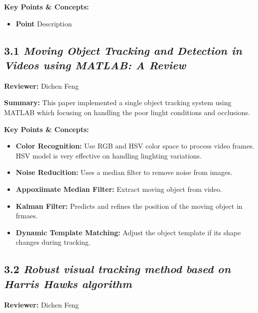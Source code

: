 \documentclass{article}
\begin{document}
\vspace{0.3cm}

\textbf{Key Points \& Concepts:}
\begin{itemize}
  \item \textbf{Point} Description
\end{itemize}

\subsection*{3.1 \textit{Moving Object Tracking and Detection in Videos using MATLAB: A Review}}

\hspace*{\parindent}\textbf{Reviewer:} Dichen Feng

\vspace{0.3cm}

\textbf{Summary:} This paper implemented a single object tracking system using MATLAB which focusing on handling the poor linght conditions and occlusions.

\vspace{0.3cm}

\textbf{Key Points \& Concepts:}
\begin{itemize}
  \item \textbf{Color Recognition:} Use RGB and HSV color space to process video frames. HSV model is very effective on handling linghting variations.
  \item \textbf{Noise Reducition:} Uses a median filter to remove noise from images.
  \item \textbf{Appoxiimate Median Filter:} Extract moving object from video.
  \item \textbf{Kalman Filter:} Predicts and refines the position of the moving object in frmaes.
  \item \textbf{Dynamic Template Matching:} Adjust the object template if its shape changes during tracking.
\end{itemize}

\subsection*{3.2 \textit{Robust visual tracking method based on Harris Hawks algorithm}}

\hspace*{\parindent}\textbf{Reviewer:} Dichen Feng
\end{document}
